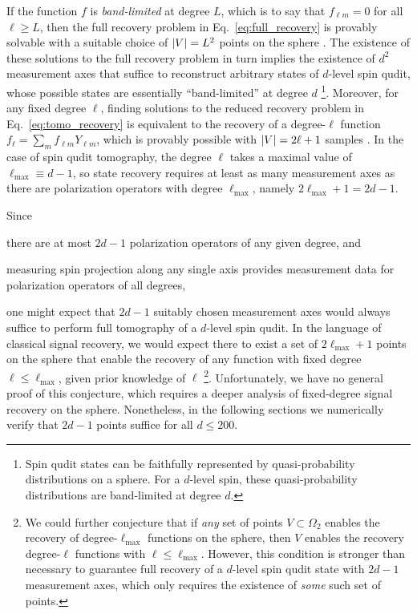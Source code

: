 \documentclass[notitlepage,twocolumn]{revtex4-2}
\renewcommand{\t}{\text} %
\begin{document}
If the function $f$ is {\it band-limited} at degree $L$, which is to say that $f_{\ell m}=0$ for all $\ell\ge L$, then the full recovery problem in Eq.~\eqref{eq:full_recovery} is provably solvable with a suitable choice of $\abs{V}=L^2$ points on the sphere \cite{freeden2008spherical, freeden2018spherical}.
The existence of these solutions to the full recovery problem in turn implies the existence of $d^2$ measurement axes that suffice to reconstruct arbitrary states of $d$-level spin qudit, whose possible states are essentially ``band-limited'' at degree $d$ \footnote{Spin qudit states can be faithfully represented by quasi-probability distributions on a sphere.
  For a $d$-level spin, these quasi-probability distributions are band-limited at degree $d$.}.
Moreover, for any fixed degree $\ell$, finding solutions to the reduced recovery problem in Eq.~\eqref{eq:tomo_recovery} is equivalent to the recovery of a degree-$\ell$ function $f_\ell = \sum_m f_{\ell m} Y_{\ell m}$, which is provably possible with $\abs{V}=2\ell+1$ samples \cite{freeden2008spherical}.
In the case of spin qudit tomography, the degree $\ell$ takes a maximal value of $\ell_{\t{max}}\equiv d-1$, so state recovery requires at least as many measurement axes as there are polarization operators with degree $\ell_{\t{max}}$, namely $2\ell_{\t{max}}+1=2d-1$.

Since
\begin{enumerate*}
\item there are at most $2d-1$ polarization operators of any given degree, and
\item measuring spin projection along any single axis provides measurement data for polarization operators of all degrees,
\end{enumerate*}
one might expect that $2d-1$ suitably chosen measurement axes would always suffice to perform full tomography of a $d$-level spin qudit.
In the language of classical signal recovery, we would expect there to exist a set of $2\ell_{\t{max}}+1$ points on the sphere that enable the recovery of any function with fixed degree $\ell\le\ell_{\t{max}}$, given prior knowledge of $\ell$ \footnote{We could further conjecture that if {\it any} set of points $V\subset\Omega_2$ enables the recovery of degree-$\ell_{\t{max}}$ functions on the sphere, then $V$ enables the recovery degree-$\ell$ functions with $\ell\le\ell_{\t{max}}$.
  However, this condition is stronger than necessary to guarantee full recovery of a $d$-level spin qudit state with $2d-1$ measurement axes, which only requires the existence of {\it some} such set of points.}.
Unfortunately, we have no general proof of this conjecture, which requires a deeper analysis of fixed-degree signal recovery on the sphere.
Nonetheless, in the following sections we numerically verify that $2d-1$ points suffice for all $d\le200$.
\end{document}
